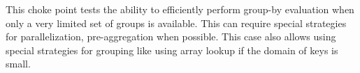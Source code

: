 
This choke point tests the ability to efficiently perform group-by evaluation
when only a very limited set of groups is available.  This can require special
strategies for parallelization, \eg pre-aggregation when possible. This case
also allows using special strategies for grouping like using array lookup if the
domain of keys is small.


